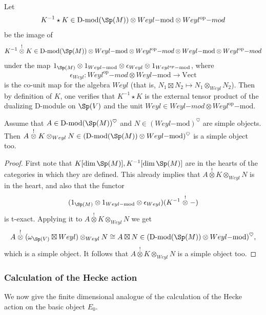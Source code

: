 \documentclass[11pt]{article}
\begin{document}
Let $$K^{-1}\star K\in \operatorname{D-mod}(\Sp(M))\otimes Weyl\mathrm{-mod}\otimes Weyl^{\mathrm{op}}{-mod}$$ be the image of $$K^{-1}\stackrel{!}{\otimes} K\in \operatorname{D-mod}(\Sp(M))\otimes Weyl\mathrm{-mod}\otimes Weyl^{\mathrm{op}}{-mod}\otimes Weyl\mathrm{-mod}\otimes Weyl^{\mathrm{op}}{-mod}$$ under the map $1_{\Sp(M)}\otimes 1_{Weyl\mathrm{-mod}}\otimes \epsilon_{Weyl} \otimes 1_{Weyl^{op}\mathrm{-mod}}$, where $$\epsilon_{Weyl}:Weyl^{\mathrm{op}}{-mod}\otimes Weyl\mathrm{-mod}\to \mathrm{Vect}$$ is the co-unit map for the algebra $Weyl$ (that is, $N_1\boxtimes N_2\mapsto N_1\otimes_{Weyl} N_2$).
Then by definition of $K$, one verifies that $K^{-1}\star K$ is the external tensor product of the dualizing D-module on $\Sp(V)$ and the unit $Weyl \in Weyl{-mod}\otimes Weyl^{\mathrm{op}}\mathrm{-mod}$.

\begin{corollary}\label{cor: kernel invertability}
    Assume that $A\in \operatorname{D-mod}(\Sp(M))^\heartsuit$ and $N\in (Weyl\mathrm{-mod})^\heartsuit$ are simple objects. Then $A\stackrel{!}{\otimes}K \otimes_{Weyl} N\in (\operatorname{D-mod}(\Sp(M))\otimes Weyl\mathrm{-mod})^\heartsuit$ is a simple object too.
\end{corollary}
\begin{proof}
    First note that $K[\dim \Sp(M)], K^{-1}[\dim \Sp(M)]$ are in the hearts of the categories in which they are defined. This already implies that $A\stackrel{!}{\otimes}K \otimes_{Weyl} N$ is in the heart, and also that the functor $$(1_{\Sp(M)}\otimes 1_{Weyl\mathrm{-mod}}\otimes \epsilon_{Weyl})(K^{-1}\stackrel{!}{\otimes} -)$$ is t-exact. Applying it to $A\stackrel{!}{\otimes}K \otimes_{Weyl} N$ we get $$A\stackrel{!}{\otimes}(\omega_{\Sp(V)}\boxtimes Weyl)\otimes_{Weyl} N\cong A\boxtimes N\in (\operatorname{D-mod}(\Sp(M))\otimes Weyl\mathrm{-mod})^\heartsuit,$$ which is a simple object. It follows that $A\stackrel{!}{\otimes}K \otimes_{Weyl} N$ is a simple object too.
\end{proof}

\subsubsection{Calculation of the Hecke action}\label{sec: finite case Hecke action theta calculation}
We now give the finite dimensional analogue of the calculation of the Hecke action on the basic object $E_0$.
\end{document}
